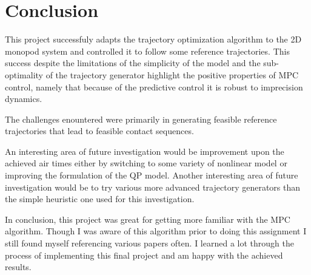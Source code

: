 \documentclass[conference]{IEEEtran}
\begin{document}
\section{Conclusion}
\label{sec:conclusion}

This project successfuly adapts the trajectory optimization algorithm to the 2D monopod system and controlled it to follow some reference trajectories.
This success despite the limitations of the simplicity of the model and the sub-optimality of the trajectory generator highlight the positive properties of MPC control, namely that because of the predictive control it is robust to imprecision dynamics.

The challenges enountered were primarily in generating feasible reference trajectories that lead to feasible contact sequences.

An interesting area of future investigation would be improvement upon the achieved air times either by switching to some variety of nonlinear model or improving the formulation of the QP model.
Another interesting area of future investigation would be to try various more advanced trajectory generators than the simple heuristic one used for this investigation.

In conclusion, this project was great for getting more familiar with the MPC algorithm.
Though I was aware of this algorithm prior to doing this assignment I still found myself referencing various papers often.
I learned a lot through the process of implementing this final project and am happy with the achieved results.



\end{document}
